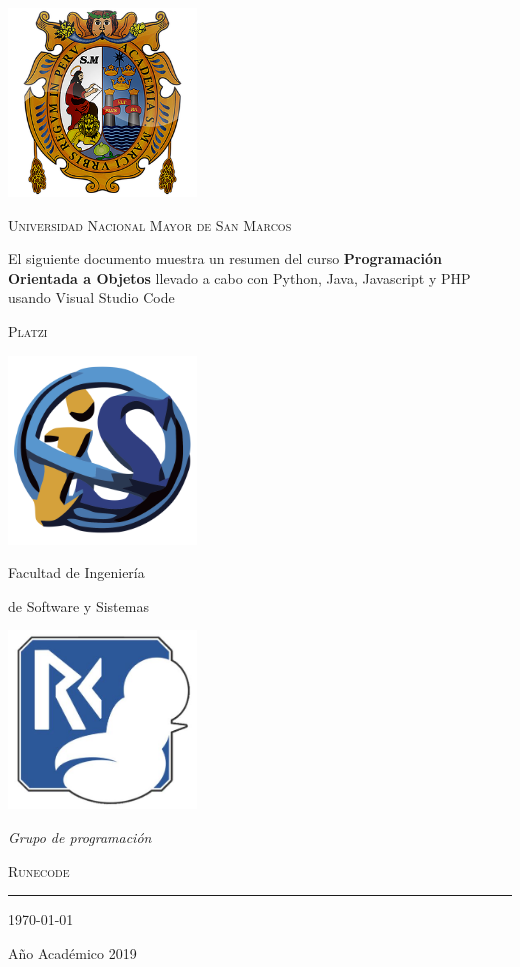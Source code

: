 \documentclass[a4paper,12pt]{book}
\begin{document}
\begin{titlepage}
	\vspace*{-3cm}
	\centering
		\includegraphics[width=5cm]{./escudo_UNMSM.png}
    

	{\scshape\LARGE Universidad Nacional Mayor de San Marcos\par}

	\vspace{1cm}

  {\large El siguiente documento muestra un resumen del curso
  \textbf{Programación Orientada a Objetos} llevado a cabo con Python, Java,
  Javascript y PHP usando Visual Studio Code \par}

	\vspace{.1\textheight}
  { \LARGE \scshape Platzi}

	\vspace{.07\textheight}

	\parbox{.4\linewidth}{
			\includegraphics[width=5cm]{./escudo_FISI.png}\par
			{Facultad de Ingeniería\par
			de Software y Sistemas}
		}\hfill
	\parbox{.5\linewidth}{
		\raggedleft
			\includegraphics[width=5cm]{./captura.jpg}\par
			\emph{Grupo de programación}\par
			\textsc{Runecode}%
	}

		\vspace{.1\linewidth}

			\vfill

			\rule{.4\textwidth}{.4pt}

	{\large \today\par
	Año Académico 2019\par}

\end{titlepage}
\end{document}
